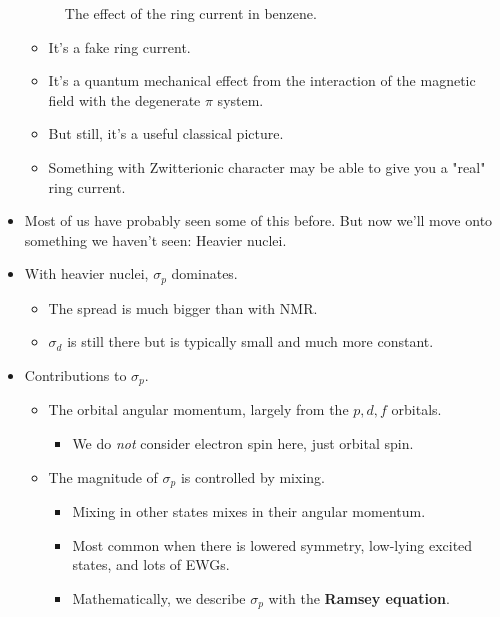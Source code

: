 \documentclass[../notes.tex]{subfiles}
\begin{document}
\begin{itemize}
\begin{figure}[h!]
        \caption{The effect of the ring current in benzene.}
        \label{fig:BnzRingCurrent}
    \end{figure}
    \begin{itemize}
        \item It's a fake ring current.
        \item It's a quantum mechanical effect from the interaction of the magnetic field with the degenerate $\pi$ system.
        \item But still, it's a useful classical picture.
        \item Something with Zwitterionic character may be able to give you a "real" ring current.
    \end{itemize}
    \item Most of us have probably seen some of this before. But now we'll move onto something we haven't seen: Heavier nuclei.
    \item With heavier nuclei, $\sigma_p$ dominates.
    \begin{itemize}
        \item The spread is much bigger than with  NMR.
        \item $\sigma_d$ is still there but is typically small and much more constant.
    \end{itemize}
    \item Contributions to $\sigma_p$.
    \begin{itemize}
        \item The orbital angular momentum, largely from the $p,d,f$ orbitals.
        \begin{itemize}
            \item We do \emph{not} consider electron spin here, just orbital spin.
        \end{itemize}
        \item The magnitude of $\sigma_p$ is controlled by mixing.
        \begin{itemize}
            \item Mixing in other states mixes in their angular momentum.
            \item Most common when there is lowered symmetry, low-lying excited states, and lots of EWGs.
            \item Mathematically, we describe $\sigma_p$ with the \textbf{Ramsey equation}.

\end{itemize}
\end{itemize}
\end{itemize}
\end{document}
